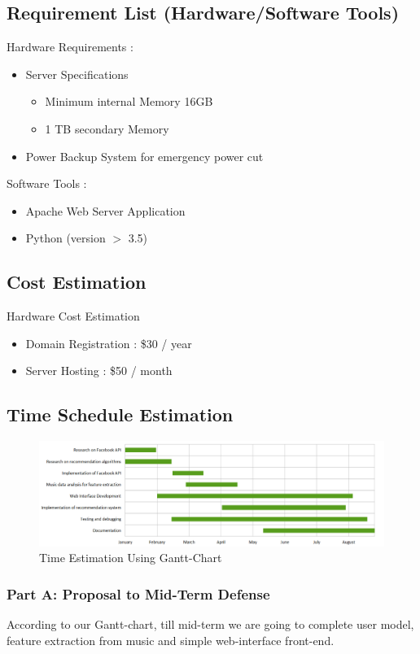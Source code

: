 \documentclass{article}
\begin{document}
\subsection{Requirement List (Hardware/Software Tools)}
Hardware Requirements :
\begin{itemize}
\item Server Specifications
  \begin{itemize}
  \item Minimum internal Memory 16GB
  \item 1 TB secondary Memory
  \end{itemize}
\item Power Backup System for emergency power cut
\end{itemize}

Software Tools :
\begin{itemize}
\item Apache Web Server Application
\item Python (version $>$ 3.5)
\end{itemize}

\subsection{Cost Estimation}
Hardware Cost Estimation
\begin{itemize}
\item Domain Registration : \$30 / year
\item Server Hosting : \$50 / month
\end{itemize}

\subsection{Time Schedule Estimation}
\begin{figure}[ht!]
  \includegraphics[width=450px]{figs/ganttchart.png}
  \caption{Time Estimation Using Gantt-Chart \label{fig:ganttchart}}
\end{figure}

\subsubsection{Part A: Proposal to Mid-Term Defense}
According to our Gantt-chart, till mid-term we are going to complete user model, feature extraction from music and simple web-interface front-end.
\end{document}
